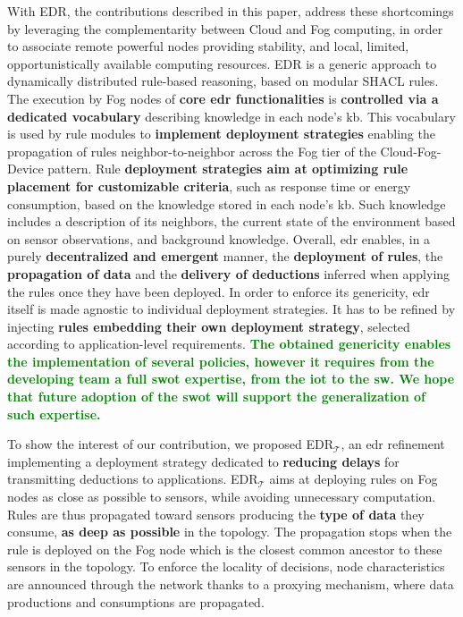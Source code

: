 \documentclass{iosart2c}
\newcommand{\edr}{EDR\xspace}
\newcommand{\edrt}{EDR$_{\mathcal{T}}$\xspace}
\newcommand{\added}[1]{\textcolor{green}{\textbf{#1}}}
\begin{document}
With \edr, the contributions described in this paper, address these shortcomings by leveraging the complementarity between Cloud and Fog computing, in order to associate remote powerful nodes providing stability, and local, limited, opportunistically available computing resources.
\edr is a generic approach to dynamically distributed rule-based reasoning, based on modular SHACL rules.
The execution by Fog nodes of \textbf{core \gls{edr} functionalities} is \textbf{controlled via a dedicated vocabulary} describing knowledge in each node's \gls{kb}.
This vocabulary is used by rule modules to \textbf{implement deployment strategies} enabling the propagation of rules neighbor-to-neighbor across the Fog tier of the Cloud-Fog-Device pattern.
Rule \textbf{deployment strategies aim at optimizing rule placement for customizable criteria}, such as response time or energy consumption, based on the knowledge stored in each node's \gls{kb}.
Such knowledge includes a description of its neighbors, the current state of the environment based on sensor observations, and background knowledge.
Overall, \gls{edr} enables, in a purely \textbf{decentralized and emergent} manner, the \textbf{deployment of rules}, the \textbf{propagation of data} and the \textbf{delivery of deductions} inferred when applying the rules once they have been deployed.
In order to enforce its genericity, \gls{edr} itself is made agnostic to individual deployment strategies.
It has to be refined by injecting \textbf{rules embedding their own deployment strategy}, selected according to application-level requirements.
\added{The obtained genericity enables the implementation of several policies, however it requires from the developing team a full \gls{swot} expertise, from the \gls{iot} to the \gls{sw}.
We hope that future adoption of the \gls{swot} will support the generalization of such expertise.}

To show the interest of our contribution, we proposed \edrt, an \gls{edr} refinement implementing a deployment strategy dedicated to \textbf{reducing delays} for transmitting deductions to applications.
\edrt aims at deploying rules on Fog nodes as close as possible to sensors, while avoiding unnecessary computation.
Rules are thus propagated toward sensors producing the \textbf{type of data} they consume, \textbf{as deep as possible} in the topology. 
The propagation stops when the rule is deployed on the Fog node which is the closest common ancestor to these sensors in the topology.
To enforce the locality of decisions, node characteristics are announced through the network thanks to a proxying mechanism, where data productions and consumptions are propagated.
\end{document}
